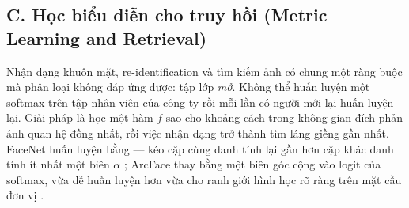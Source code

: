 \documentclass[../../../deep_learning.tex]{subfiles}
\begin{document}
\subsection{C. Học biểu diễn cho truy hồi (Metric Learning and Retrieval)}
Nhận dạng khuôn mặt, re-identification và tìm kiếm ảnh có chung một ràng buộc mà phân loại không đáp ứng được: tập lớp \emph{mở}. Không thể huấn luyện một softmax trên tập nhân viên của công ty rồi mỗi lần có người mới lại huấn luyện lại. Giải pháp là học một hàm  \(f\) sao cho khoảng cách trong không gian đích phản ánh quan hệ đồng nhất, rồi việc nhận dạng trở thành tìm láng giềng gần nhất. FaceNet huấn luyện bằng  --- kéo cặp cùng danh tính lại gần hơn cặp khác danh tính ít nhất một biên \(\alpha\) \cite{schroff2015facenet}; ArcFace thay bằng một biên góc cộng vào logit của softmax, vừa dễ huấn luyện hơn vừa cho ranh giới hình học rõ ràng trên mặt cầu đơn vị \cite{deng2019arcface}.
\end{document}
